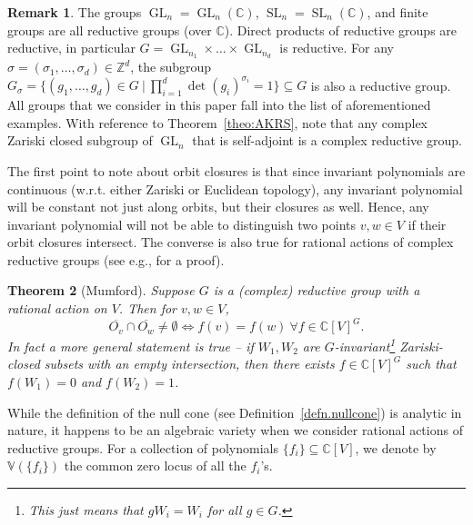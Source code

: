 \documentclass[11pt]{amsart}
\newtheorem{theorem}{Theorem}[section]
\theoremstyle{definition}
\newtheorem{remark}[theorem]{Remark}
\newcommand{\R}{{\mathbb R}}
\newcommand{\C}{{\mathbb C}}
\newcommand{\Z}{{\mathbb Z}}
\newcommand{\GL}{\operatorname{GL}}
\newcommand{\SL}{\operatorname{SL}}
\begin{document}
\begin{remark} \label{reductive.egs}
 The groups $\GL_n = \GL_n(\C)$, $\SL_n  = \SL_n(\C)$, and finite groups are all reductive groups (over $\C$). Direct products of reductive groups are reductive, in particular $G = \GL_{n_1} \times \dots \times \GL_{n_d}$ is reductive. For any $\sigma = (\sigma_1,\dots,\sigma_d) \in \Z^{d}$, the subgroup $G_\sigma = \{(g_1,\dots,g_d) \in G\ |\ \prod_{i=1}^d \det(g_i)^{\sigma_i} = 1 \} \subseteq G$ is also a reductive group. All groups that we consider in this paper fall into the list of aforementioned examples. With reference to Theorem~\ref{theo:AKRS}, note that any complex Zariski closed subgroup of $\GL_n$ that is self-adjoint is a complex reductive group.
\end{remark}


The first point to note about orbit closures is that since invariant polynomials are continuous (w.r.t. either Zariski or Euclidean topology), any invariant polynomial will be constant not just along orbits, but their closures as well. Hence, any invariant polynomial will not be able to distinguish two points $v,w \in V$ if their orbit closures intersect. The converse is also true for rational actions of complex reductive groups (see e.g., \cite[Lemma~3.8]{Hoskins} for a proof).

\begin{theorem} [Mumford] \label{theo:mum}
Suppose $G$ is a (complex) reductive group with a rational action on $V$. Then for $v,w \in V$,
$$
\overline{O_v} \cap \overline{O_w} \neq \emptyset \Longleftrightarrow f(v) = f(w) \ \forall f \in \C[V]^G.
$$
In fact a more general statement is true -- if $W_1,W_2$ are $G$-invariant\footnote{This just means that $g W_i = W_i$ for all $g \in G$.} Zariski-closed subsets with an empty intersection, then there exists $f \in \C[V]^G$ such that $f(W_1) = 0$ and $f(W_2) = 1$.
\end{theorem}



While the definition of the null cone (see Definition~\ref{defn.nullcone}) is analytic in nature, it happens to be an algebraic variety when we consider rational actions of reductive groups. For a collection of polynomials $\{f_i\} \subseteq \C[V]$, we denote by $\mathbb{V}(\{f_i\})$ the common zero locus of all the $f_i$'s.
\end{document}
